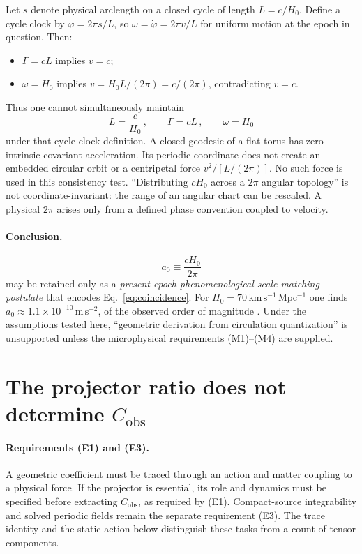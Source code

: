 \documentclass[aps,prd,reprint,superscriptaddress,nofootinbib,floatfix,showkeys]{revtex4-2}
\newcommand{\Cobs}{C_{\mathrm{obs}}}
\newcommand{\azero}{a_{0}}
\newcommand{\Hzero}{H_{0}}
\begin{document}
Let \(s\) denote physical arclength on a closed cycle of length
\(L=c/\Hzero\). Define a cycle clock by
\(\varphi=2\pi s/L\), so \(\omega=\dot\varphi=2\pi v/L\) for uniform
motion at the epoch in question. Then:
\begin{itemize}
\item \(\Gamma=cL\) implies \(v=c\);
\item \(\omega=\Hzero\) implies
  \(v=\Hzero L/(2\pi)=c/(2\pi)\), contradicting \(v=c\).
\end{itemize}
Thus one cannot simultaneously maintain
\begin{equation}
  L=\frac{c}{\Hzero}\,,
  \qquad
  \Gamma=cL\,,
  \qquad
  \omega=\Hzero
  \label{eq:inconsistent}
\end{equation}
under that cycle-clock definition. A closed geodesic of a flat torus has
zero intrinsic covariant acceleration. Its periodic coordinate does not
create an embedded circular orbit or a centripetal force \(v^2/[L/(2\pi)]\).
No such force is used in this consistency test. ``Distributing \(c\Hzero\) across a
\(2\pi\) angular topology'' is not coordinate-invariant: the range of an
angular chart can be rescaled.  A physical \(2\pi\) arises only from a defined
phase convention coupled to velocity.

\paragraph{Conclusion.}
\begin{equation}
  \azero \equiv \frac{c\Hzero}{2\pi}
  \label{eq:a0-phen}
\end{equation}
may be retained only as a \emph{present-epoch phenomenological scale-matching
postulate} that encodes Eq.~\eqref{eq:coincidence}.  For
\(\Hzero=70\,\mathrm{km\,s^{-1}\,Mpc^{-1}}\) one finds
\(\azero\approx 1.1\times 10^{-10}\,\mathrm{m\,s^{-2}}\), of the observed
order of magnitude \cite{mcgaugh_rar}.  Under the assumptions tested here,
``geometric derivation from circulation quantization'' is unsupported unless
the microphysical requirements (M1)--(M4) are supplied.

\section{The projector ratio does not determine
\texorpdfstring{\(\Cobs\)}{C\_obs}}
\label{sec:proj}

\paragraph{Requirements (E1) and (E3).}
A geometric coefficient must be traced through an action and matter coupling
to a physical force.  If the projector is essential, its role and dynamics
must be specified before extracting \(\Cobs\), as required by (E1).
Compact-source integrability and solved periodic fields remain the separate
requirement (E3).  The trace identity and the static action below distinguish
these tasks from a count of tensor components.
\end{document}
